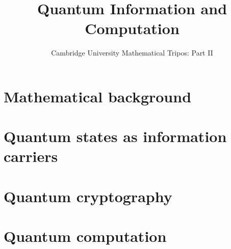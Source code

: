\documentclass{article}
\title{Quantum Information and Computation}
\author{Cambridge University Mathematical Tripos: Part II}
\begin{document}
\maketitle

\tableofcontentsnewpage{}

\section{Mathematical background}

\section{Quantum states as information carriers}

\section{Quantum cryptography}

\section{Quantum computation}

\end{document}
